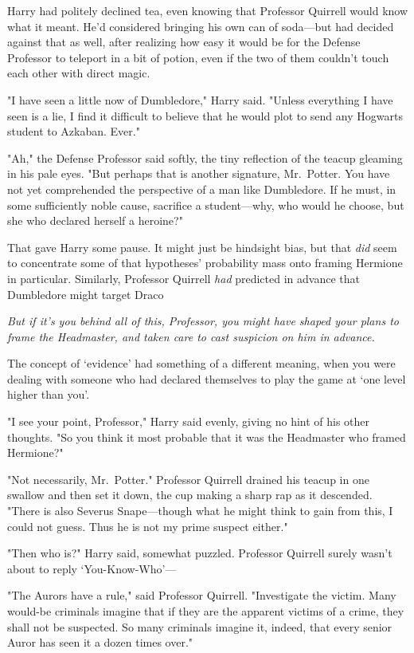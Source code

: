 Harry had politely declined tea, even knowing that Professor Quirrell would
know what it meant. He'd considered bringing his own can of soda—but had
decided against that as well, after realizing how easy it would be for the
Defense Professor to teleport in a bit of potion, even if the two of them
couldn't touch each other with direct magic.

"I have seen a little now of Dumbledore," Harry said. "Unless everything I have
seen is a lie, I find it difficult to believe that he would plot to send any
Hogwarts student to Azkaban. Ever."

"Ah," the Defense Professor said softly, the tiny reflection of the teacup
gleaming in his pale eyes. "But perhaps that is another signature, Mr.~Potter.
You have not yet comprehended the perspective of a man like Dumbledore. If he
must, in some sufficiently noble cause, sacrifice a student—why, who would he
choose, but she who declared herself a heroine?"

That gave Harry some pause. It might just be hindsight bias, but that
\emph{did} seem to concentrate some of that hypotheses' probability mass onto
framing Hermione in particular. Similarly, Professor Quirrell \emph{had}
predicted in advance that Dumbledore might target Draco{\el}

\emph{But if it's you behind all of this, Professor, you might have shaped your
plans to frame the Headmaster, and taken care to cast suspicion on him in
advance.}

The concept of `evidence' had something of a different meaning, when you were
dealing with someone who had declared themselves to play the game at `one level
higher than you'.

"I see your point, Professor," Harry said evenly, giving no hint of his other
thoughts. "So you think it most probable that it was the Headmaster who framed
Hermione?"

"Not necessarily, Mr.~Potter." Professor Quirrell drained his teacup in one
swallow and then set it down, the cup making a sharp rap as it descended.
"There is also Severus Snape—though what he might think to gain from this, I
could not guess. Thus he is not my prime suspect either."

"Then who is?" Harry said, somewhat puzzled. Professor Quirrell surely wasn't
about to reply `You-Know-Who'—

"The Aurors have a rule," said Professor Quirrell. "Investigate the victim.
Many would-be criminals imagine that if they are the apparent victims of a
crime, they shall not be suspected. So many criminals imagine it, indeed, that
every senior Auror has seen it a dozen times over."

